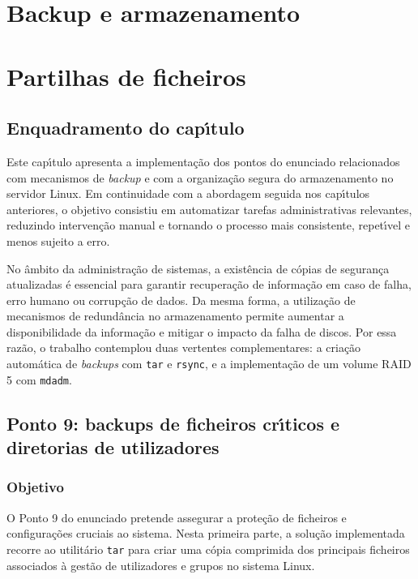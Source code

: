 \setcounter{chapter}{6}
\chapter{Backup e armazenamento}
\chapter{Partilhas de ficheiros}
\label{cap6}

\section{Enquadramento do cap\'{\i}tulo}

Este cap\'{\i}tulo apresenta a implementa\c{c}\~ao dos pontos do enunciado relacionados com mecanismos de \textit{backup} e com a organiza\c{c}\~ao segura do armazenamento no servidor Linux. Em continuidade com a abordagem seguida nos cap\'{\i}tulos anteriores, o objetivo consistiu em automatizar tarefas administrativas relevantes, reduzindo interven\c{c}\~ao manual e tornando o processo mais consistente, repet\'{\i}vel e menos sujeito a erro.

No \^ambito da administra\c{c}\~ao de sistemas, a exist\^encia de c\'opias de seguran\c{c}a atualizadas \'{e} essencial para garantir recupera\c{c}\~ao de informa\c{c}\~ao em caso de falha, erro humano ou corrup\c{c}\~ao de dados. Da mesma forma, a utiliza\c{c}\~ao de mecanismos de redund\^ancia no armazenamento permite aumentar a disponibilidade da informa\c{c}\~ao e mitigar o impacto da falha de discos. Por essa raz\~ao, o trabalho contemplou duas vertentes complementares: a cria\c{c}\~ao autom\'atica de \textit{backups} com \texttt{tar} e \texttt{rsync}, e a implementa\c{c}\~ao de um volume RAID 5 com \texttt{mdadm}.

\section{Ponto 9: backups de ficheiros cr\'{\i}ticos e diretorias de utilizadores}
\label{sec:p9}

\subsection{Objetivo}

O Ponto 9 do enunciado pretende assegurar a prote\c{c}\~ao de ficheiros e configura\c{c}\~oes cruciais ao sistema. Nesta primeira parte, a solu\c{c}\~ao implementada recorre ao utilit\'ario \texttt{tar} para criar uma c\'opia comprimida dos principais ficheiros associados \`a gest\~ao de utilizadores e grupos no sistema Linux.

